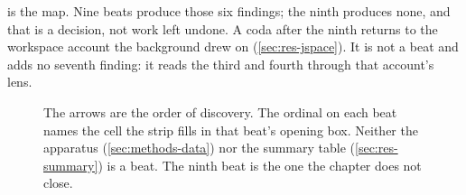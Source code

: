 \noindent
{} is the map. Nine beats produce those six findings; the ninth
produces none, and that is a decision, not work left undone. A coda after the
ninth returns to the workspace account the background drew on
(\cref{sec:res-jspace}). It is not a beat and adds no seventh finding: it reads
the third and fourth through that account's lens.

\begin{figure}[htbp]
\begin{fullwidth}\raggedright

\caption[The investigation in nine beats]{ The arrows are the order of
discovery. The ordinal on each beat names the cell the strip fills in that
beat's opening box. Neither the apparatus (\cref{sec:methods-data}) nor the
summary table (\cref{sec:res-summary}) is a beat. The ninth beat is the one the
chapter does not close.}
\label{fig:timeline}
\end{fullwidth}
\end{figure}






